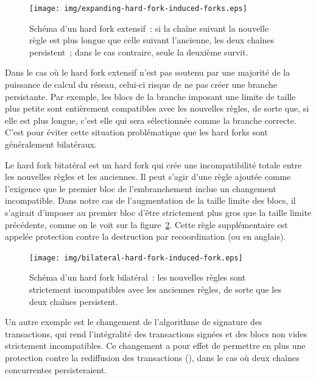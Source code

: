 \begin{figure}[h]
  \centering
  \texttt{[image: img/expanding-hard-fork-induced-forks.eps]}
  \caption{Schéma d'un hard fork extensif~: si la chaîne suivant la nouvelle règle est plus longue que celle suivant l'ancienne, les deux chaînes persistent~; dans le cas contraire, seule la deuxième survit.}
  \label{fig:expanding-hard-fork}
\end{figure}

Dans le cas où le hard fork extensif n'est pas soutenu par une majorité de la puissance de calcul du réseau, celui-ci risque de ne pas créer une branche persistante. Par exemple, les blocs de la branche imposant une limite de taille plus petite sont entièrement compatibles avec les nouvelles règles, de sorte que, si elle est plus longue, c'est elle qui sera sélectionnée comme la branche correcte. C'est pour éviter cette situation problématique que les hard forks sont généralement bilatéraux.

Le hard fork bitatéral est un hard fork qui crée une incompatibilité totale entre les nouvelles règles et les anciennes. Il peut s'agir d'une règle ajoutée comme l'exigence que le premier bloc de l'embranchement inclue un changement incompatible. Dans notre cas de l'augmentation de la taille limite des blocs, il s'agirait d'imposer au premier bloc d'être strictement plus gros que la taille limite précédente, comme on le voit sur la figure~\ref{fig:expanding-hard-fork-failure}. Cette règle supplémentaire est appelée protection contre la destruction par recoordination (ou  en anglais).

\begin{figure}[h]
  \centering
  \texttt{[image: img/bilateral-hard-fork-induced-fork.eps]}
  \caption{Schéma d'un hard fork bilatéral~: les nouvelles règles sont strictement incompatibles avec les anciennes règles, de sorte que les deux chaînes persistent.}
  \label{fig:expanding-hard-fork-failure}
\end{figure}

Un autre exemple est le changement de l'algorithme de signature des transactions, qui rend l'intégralité des transactions signées et des blocs non vides strictement incompatibles. Ce changement a pour effet de permettre en plus une protection contre la rediffusion des transactions (), dans le cas où deux chaînes concurrentes persisteraient.

